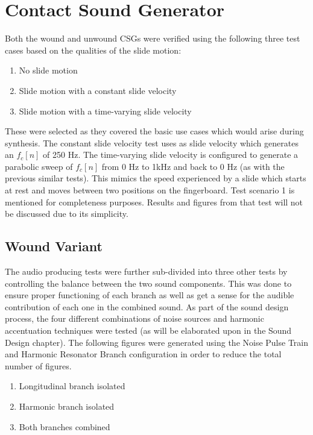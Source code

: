 \documentclass[../main.tex]{subfiles}
\begin{document}
\section{Contact Sound Generator}
Both the wound and unwound CSGs were verified using the following three test cases based on the qualities of the slide motion:

\begin{enumerate}
    \item No slide motion
    \item Slide motion with a constant slide velocity
    \item Slide motion with a time-varying slide velocity
\end{enumerate}

These were selected as they covered the basic use cases which would arise during synthesis. The constant slide velocity test uses as slide velocity which generates an $f_c[n]$ of 250 Hz. The time-varying slide velocity is configured to generate a parabolic sweep of $f_c[n]$ from 0 Hz to 1kHz and back to 0 Hz (as with the previous similar tests). This mimics the speed experienced by a slide which starts at rest and moves between two positions on the fingerboard. Test scenario 1 is mentioned for completeness purposes. Results and figures from that test will not be discussed due to its simplicity.

\subsection{Wound Variant}
The audio producing tests were further sub-divided into three other tests by controlling the balance between the two sound components. This was done to ensure proper functioning of each branch as well as get a sense for the audible contribution of each one in the combined sound. As part of the sound design process, the four different combinations of noise sources and harmonic accentuation techniques were tested (as will be elaborated upon in the Sound Design chapter). The following figures were generated using the Noise Pulse Train and Harmonic Resonator Branch configuration in order to reduce the total number of figures.

\begin{enumerate}
    \item Longitudinal branch isolated
    \item Harmonic branch isolated
    \item Both branches combined
\end{enumerate}
\end{document}
